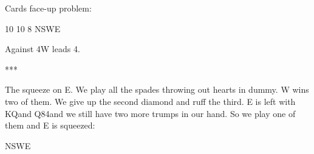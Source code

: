 \documentclass[12pt, a4paper]{article}
\begin{document}
Cards face-up problem:

        {}{10}
        {}{10}
        {}{8}
        {NSWE}


Against 4\spades W leads 4\diams.
\begin{center}
    ***
\end{center}

The \twosuit{\clubs}{\diams} squeeze on E.
We play all the spades throwing out hearts in dummy.
W wins two of them. We give up the
second diamond and ruff the third. E is left
with KQ\diams and Q84\clubs and we still have two
more trumps in our hand. So we play one of them and
E is squeezed:

        {}{}
        {}{}
        {}{}
        {NSWE}
\end{document}
